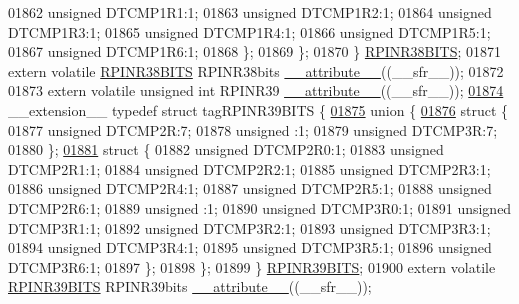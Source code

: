 \begin{DoxyCode}
01862       \textcolor{keywordtype}{unsigned} DTCMP1R1:1;
01863       \textcolor{keywordtype}{unsigned} DTCMP1R2:1;
01864       \textcolor{keywordtype}{unsigned} DTCMP1R3:1;
01865       \textcolor{keywordtype}{unsigned} DTCMP1R4:1;
01866       \textcolor{keywordtype}{unsigned} DTCMP1R5:1;
01867       \textcolor{keywordtype}{unsigned} DTCMP1R6:1;
01868     \};
01869   \};
01870 \} \hyperlink{a00014_d2/db1/a00730}{RPINR38BITS};
01871 \textcolor{keyword}{extern} \textcolor{keyword}{volatile} \hyperlink{a00014_d2/db1/a00730}{RPINR38BITS} RPINR38bits \hyperlink{a00015_a493c46f03454991ccc5aa7a6e1dfb2a7}{\_\_attribute\_\_}((\_\_sfr\_\_));
01872 
01873 \textcolor{keyword}{extern} \textcolor{keyword}{volatile} \textcolor{keywordtype}{unsigned} \textcolor{keywordtype}{int}  RPINR39 \hyperlink{a00015_a493c46f03454991ccc5aa7a6e1dfb2a7}{\_\_attribute\_\_}((\_\_sfr\_\_));
\hypertarget{a00015_source_l01874}{}\hyperlink{a00014}{01874} \_\_extension\_\_ \textcolor{keyword}{typedef} \textcolor{keyword}{struct }tagRPINR39BITS \{
\hypertarget{a00015_source_l01875}{}\hyperlink{a00015}{01875}   \textcolor{keyword}{union }\{
\hypertarget{a00015_source_l01876}{}\hyperlink{a00015}{01876}     \textcolor{keyword}{struct }\{
01877       \textcolor{keywordtype}{unsigned} DTCMP2R:7;
01878       \textcolor{keywordtype}{unsigned} :1;
01879       \textcolor{keywordtype}{unsigned} DTCMP3R:7;
01880     \};
\hypertarget{a00015_source_l01881}{}\hyperlink{a00015}{01881}     \textcolor{keyword}{struct }\{
01882       \textcolor{keywordtype}{unsigned} DTCMP2R0:1;
01883       \textcolor{keywordtype}{unsigned} DTCMP2R1:1;
01884       \textcolor{keywordtype}{unsigned} DTCMP2R2:1;
01885       \textcolor{keywordtype}{unsigned} DTCMP2R3:1;
01886       \textcolor{keywordtype}{unsigned} DTCMP2R4:1;
01887       \textcolor{keywordtype}{unsigned} DTCMP2R5:1;
01888       \textcolor{keywordtype}{unsigned} DTCMP2R6:1;
01889       \textcolor{keywordtype}{unsigned} :1;
01890       \textcolor{keywordtype}{unsigned} DTCMP3R0:1;
01891       \textcolor{keywordtype}{unsigned} DTCMP3R1:1;
01892       \textcolor{keywordtype}{unsigned} DTCMP3R2:1;
01893       \textcolor{keywordtype}{unsigned} DTCMP3R3:1;
01894       \textcolor{keywordtype}{unsigned} DTCMP3R4:1;
01895       \textcolor{keywordtype}{unsigned} DTCMP3R5:1;
01896       \textcolor{keywordtype}{unsigned} DTCMP3R6:1;
01897     \};
01898   \};
01899 \} \hyperlink{a00014_d4/d91/a00733}{RPINR39BITS};
01900 \textcolor{keyword}{extern} \textcolor{keyword}{volatile} \hyperlink{a00014_d4/d91/a00733}{RPINR39BITS} RPINR39bits \hyperlink{a00015_a493c46f03454991ccc5aa7a6e1dfb2a7}{\_\_attribute\_\_}((\_\_sfr\_\_));

\end{DoxyCode}
